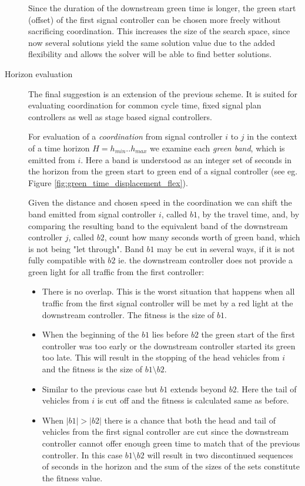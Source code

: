 \begin{description}
Since the duration of the downstream green time is longer, the green start (offset) of the first signal controller can be chosen more freely without sacrificing coordination. This increases the size of the search space, since now several solutions yield the same solution value due to the added flexibility and allows the solver will be able to find better solutions.

\item[Horizon evaluation]
The final suggestion is an extension of the previous scheme. It is suited for evaluating coordination for common cycle time, fixed signal plan controllers as well as stage based signal controllers.

For evaluation of a \textit{coordination} from signal controller $i$ to $j$ in the context of a time horizon $H = h_{min} .. h_{max}$ we examine each \textit{green band}, which is emitted from $i$. Here a band is understood as an integer set of seconds in the horizon from the green start to green end of a signal controller (see eg. Figure \ref{fig:green_time_displacement_flex}).

Given the distance and chosen speed in the coordination we can shift the band emitted from signal controller $i$, called $b1$, by the travel time, and, by comparing the resulting band to the equivalent band of the downstream controller $j$, called $b2$, count how many seconds worth of green band, which is not being "let through". Band $b1$ may be cut in several ways, if it is not fully compatible with $b2$ ie. the downstream controller does not provide a green light for all traffic from the first controller:

\begin{itemize}
\item There is no overlap. This is the worst situation that happens when all traffic from the first signal controller will be met by a red light at the downstream controller. The fitness is the size of $b1$.
\item When the beginning of the $b1$ lies before $b2$ the green start of the first controller was too early or the downstream controller started its green too late. This will result in the stopping of the head vehicles from $i$ and the fitness is the size of $b1 \setminus b2$.
\item Similar to the previous case but $b1$ extends beyond $b2$. Here the tail of vehicles from $i$ is cut off and the fitness is calculated same as before.
\item When $|b1|>|b2|$ there is a chance that both the head and tail of vehicles from the first signal controller are cut since the downstream controller cannot offer enough green time to match that of the previous controller. In this case $b1 \setminus b2$ will result in two discontinued sequences of seconds in the horizon and the sum of the sizes of the sets constitute the fitness value.
\end{itemize}


\end{description}
